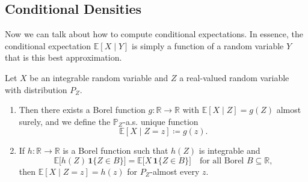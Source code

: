 \subsection{Conditional Densities}

  Now we can talk about how to compute conditional expectations. In essence, the conditional expectation $\mathbb{E}[X \mid Y]$ is simply a function of a random variable $Y$ that is this best approximation. 

	\begin{definition}
		\label{def:cond_exp_at_point}
		Let $X$ be an integrable random variable and $Z$ a real-valued random variable with distribution $P_Z$. 
		\begin{enumerate}
		  \item Then there exists a Borel function $g \colon \mathbb{R} \to \mathbb{R}$ with $\mathbb{E}[X \mid Z] = g(Z)$ almost surely, and we define the $\mathbb{P}_Z$-a.s. unique function
				\begin{equation}
					\mathbb{E}[X \mid Z = z] \coloneqq g(z).
				\end{equation}

			\item If $h \colon \mathbb{R} \to \mathbb{R}$ is a Borel function such that $h(Z)$ is integrable and
				\begin{equation}
					\label{eq:characterization}
					\mathbb{E}\big[h(Z)\,\mathbf{1}\{Z \in B\}\big] = \mathbb{E}\big[X\,\mathbf{1}\{Z \in B\}\big] \quad \text{for all Borel } B \subseteq \mathbb{R},
				\end{equation}
				then $\mathbb{E}[X \mid Z = z] = h(z)$ for $P_Z$-almost every $z$.
		\end{enumerate}
	\end{definition}

